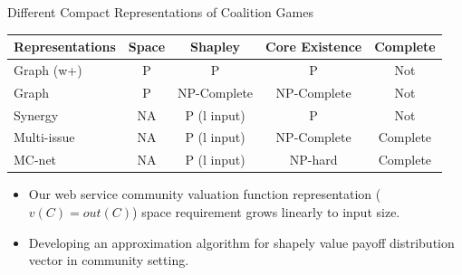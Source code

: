 \documentclass{beamer}
\begin{document}
\begin{frame}{Different Compact Representations of Coalition Games}

    \begin{table}
        \small
        \begin{tabular}{l|c|c|c|c}
        Representations                  & Space    & Shapley                  & Core Existence  & Complete     \\ \hline
        Graph (w+)                       & P        & P                        & P               & Not          \\
        Graph                            & P        & NP-Complete              & NP-Complete     & Not          \\
        Synergy                          & NA       & P (l input)              & P               & Not          \\
        Multi-issue                      & NA       & P (l input)              & NP-Complete     & Complete     \\
        MC-net                           & NA       & P (l input)              & NP-hard         & Complete     \\
        \end{tabular}
    \end{table}

    \begin{itemize}
        \item Our web service community valuation function representation ($v(C) = out(C)$) space requirement grows linearly to input size.
        \item Developing an approximation algorithm for shapely value payoff distribution vector in community setting.
    \end{itemize}

\end{frame}

\end{document}
